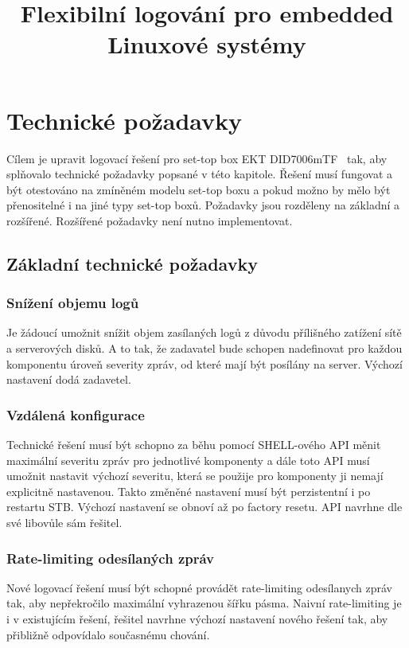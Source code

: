 \documentclass[thesis=B,czech]{FITthesis}[2012/06/26]
\title{Flexibilní logování pro embedded Linuxové systémy}
\begin{document}
\begin{introduction}

\end{introduction}

\chapter{Technické požadavky}
Cílem je upravit logovací řešení pro set-top box EKT DID7006mTF~\cite{ekt7006} tak, aby splňovalo technické požadavky popsané v této kapitole. Řešení musí fungovat a být otestováno na zmíněném modelu set-top boxu a pokud možno by mělo být přenositelné i na jiné typy set-top boxů.
Požadavky jsou rozděleny na základní a rozšířené. Rozšířené požadavky není nutno implementovat.

\section{Základní technické požadavky}

\subsection{Snížení objemu logů}
Je žádoucí umožnit snížit objem zasílaných logů z důvodu přílišného zatížení sítě a serverových disků. A to tak, že zadavatel bude schopen nadefinovat pro každou komponentu úroveň severity zpráv, od které mají být posílány na server. Výchozí nastavení dodá zadavetel.

\subsection{Vzdálená konfigurace}
Technické řešení musí být schopno za běhu pomocí SHELL-ového API měnit maximální severitu zpráv pro jednotlivé komponenty a dále toto API musí umožnit nastavit výchozí severitu, která se použije pro komponenty ji nemají explicitně nastavenou. Takto změněné nastavení musí být perzistentní i po restartu STB. Výchozí nastavení se obnoví až po factory resetu. API navrhne dle své libovůle sám řešitel.

\subsection{Rate-limiting odesílaných zpráv}
Nové logovací řešení musí být schopné provádět rate-limiting odesílanych zpráv tak, aby nepřekročilo maximální vyhrazenou šířku pásma. Naivní rate-limiting je i v existujícím řešení, řešitel navrhne výchozí nastavení nového řešení tak, aby přibližně odpovídalo současnému chování. 
\end{document}
